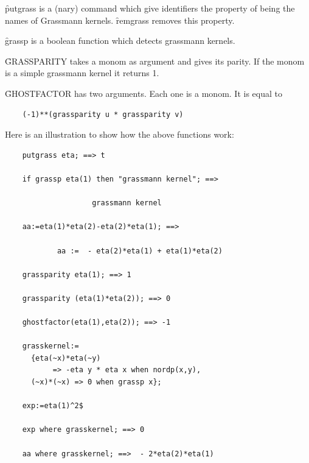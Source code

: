 \hypertarget{command:PUTGRASS}{}
\hypertarget{command:REMGRASS}{}
\f{putgrass} is a (nary) command which give identifiers the property
of being the names of Grassmann kernels. \f{remgrass} removes this property.

\hypertarget{operator:GRASSP}{}
\f{grassp} is a boolean function which detects grassmann kernels.

\hypertarget{operator:GRASSPARITY}{}
\f{GRASSPARITY} takes a monom as argument and gives its parity.
If the monom is a simple grassmann kernel it returns 1.

\hypertarget{operator:GHOSTFACTOR}{}
\f{GHOSTFACTOR} has two arguments. Each one is a monom. It is equal to
\begin{verbatim}
    (-1)**(grassparity u * grassparity v)
\end{verbatim}
Here is an illustration to show how the above functions work:
\begin{verbatim}
    putgrass eta; ==> t

    if grassp eta(1) then "grassmann kernel"; ==>

                    grassmann kernel

    aa:=eta(1)*eta(2)-eta(2)*eta(1); ==>

            aa :=  - eta(2)*eta(1) + eta(1)*eta(2)

    grassparity eta(1); ==> 1

    grassparity (eta(1)*eta(2)); ==> 0

    ghostfactor(eta(1),eta(2)); ==> -1

    grasskernel:=
      {eta(~x)*eta(~y)
           => -eta y * eta x when nordp(x,y),
      (~x)*(~x) => 0 when grassp x};

    exp:=eta(1)^2$

    exp where grasskernel; ==> 0

    aa where grasskernel; ==>  - 2*eta(2)*eta(1)
\end{verbatim}

